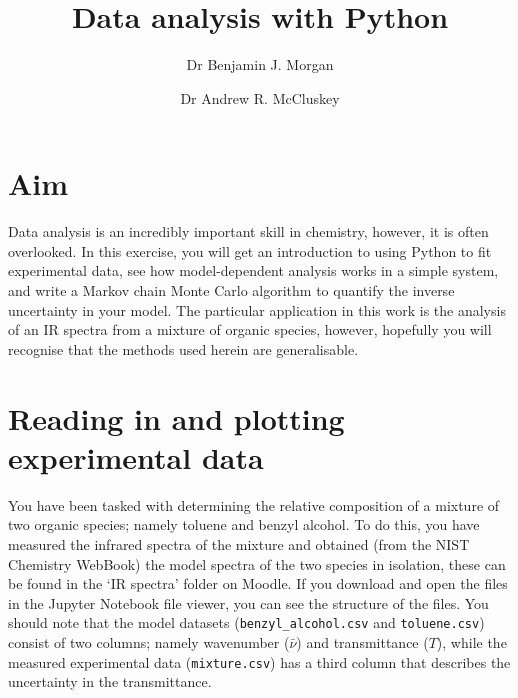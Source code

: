 \documentclass[a4paper]{article}
\title{Data analysis with Python}
\author[1]{Dr Benjamin J. Morgan}
\author[1,2]{Dr Andrew R. McCluskey}
\affil[1]{Department of Chemistry, University of Bath, email: b.j.morgan@bath.ac.uk}
\affil[2]{Diamond Light Source, email: andrew.mccluskey@diamond.ac.uk}
\begin{document}
\maketitle

\section*{Aim}
Data analysis is an incredibly important skill in chemistry, however, it is often overlooked. 
In this exercise, you will get an introduction to using Python to fit experimental data, see how model-dependent analysis works in a simple system, and write a Markov chain Monte Carlo algorithm to quantify the inverse uncertainty in your model.
The particular application in this work is the analysis of an IR spectra from a mixture of organic species, however, hopefully you will recognise that the methods used herein are generalisable.

\section{Reading in and plotting experimental data}
You have been tasked with determining the relative composition of a mixture of two organic species; namely toluene and benzyl alcohol. 
To do this, you have measured the infrared spectra of the mixture and obtained (from the NIST Chemistry WebBook) the model spectra of the two species in isolation, these can be found in the `IR spectra' folder on Moodle. 
If you download and open the files in the Jupyter Notebook file viewer, you can see the structure of the files. 
You should note that the model datasets (\texttt{benzyl\_alcohol.csv} and \texttt{toluene.csv}) consist of two columns; namely wavenumber ($\bar{\nu}$) and transmittance ($T$), while the measured experimental data (\texttt{mixture.csv}) has a third column that describes the uncertainty in the transmittance. 

\vspace{\baselineskip}
\begin{center}
	\noindent{}
\end{center}
\end{document}
